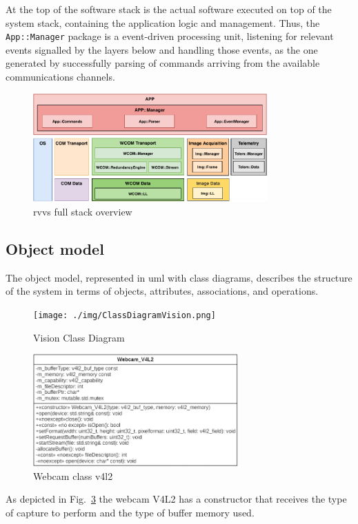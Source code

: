 At the top of the software stack is the actual software executed on top of the
system stack, containing the application logic and management. Thus, the
\texttt{App::Manager} package is a event-driven processing unit, listening for
relevant events signalled by the layers below and handling those events, as the
one generated by successfully parsing of commands arriving from the available
communications channels. 
\begin{figure}[!hbt]
\centering
    \includegraphics[width=0.8\textwidth]{./img/rvvs-full-stack.pdf}
  \caption{\acrshort{rvvs} full stack overview}%
\label{fig:rvvs-full-stack}
\end{figure}
%
\subsection{Object model}%
\label{sec:object-model-rvvs}
The object model, represented in \gls{uml} with class diagrams, describes the
structure of the system in terms of objects, attributes, associations, and
operations.
%
\begin{figure}[!hbt]
\centering
    \texttt{[image: ./img/ClassDiagramVision.png]}
  \caption{Vision Class Diagram}%
\label{fig:vision-class-diag}
\end{figure}
%
%
\begin{figure}[!hbt]
\centering
    \includegraphics[width=0.7\textwidth]{./img/webcam_v4l2_class_diag.png}
  \caption{Webcam class v4l2}%
\label{fig:webcam-v4l2-class-diag}
\end{figure}
%
As depicted in Fig.~\ref{fig:webcam-v4l2-class-diag} the
webcam V4L2 has a constructor that receives the type of capture to perform and the type of buffer memory used.

